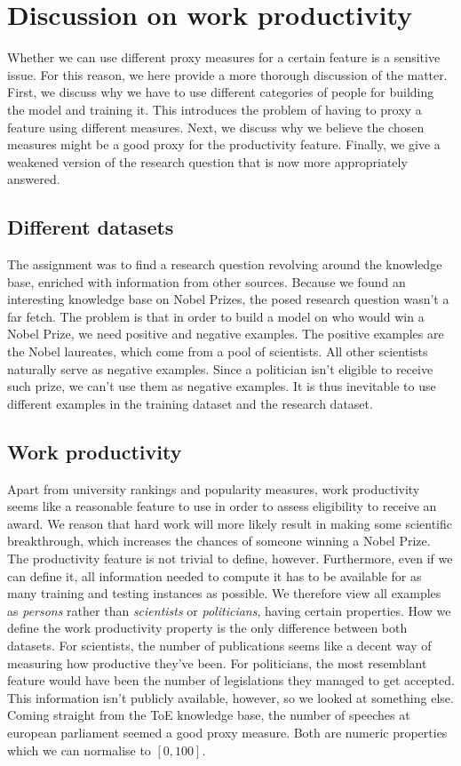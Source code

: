 \section{Discussion on work productivity}
\label{sec:productivity}

Whether we can use different proxy measures for a certain feature is a sensitive issue. For this reason, we here provide a more thorough discussion of the matter. First, we discuss why we have to use different categories of people for building the model and training it. This introduces the problem of having to proxy a feature using  different measures. Next, we discuss why we believe the chosen measures might be a good proxy for the productivity feature. Finally, we give a weakened version of the research question that is now more appropriately answered.

\subsection{Different datasets}

The assignment was to find a research question revolving around the knowledge base, enriched with information from other sources. Because we found an interesting knowledge base on Nobel Prizes, the posed research question wasn't a far fetch. The problem is that in order to build a model on who would win a Nobel Prize, we need positive and negative examples. The positive examples are the Nobel laureates, which come from a pool of scientists. All other scientists naturally serve as negative examples. Since a politician isn't eligible to receive such prize, we can't use them as negative examples. It is thus inevitable to use different examples in the training dataset and the research dataset.

\subsection{Work productivity}

Apart from university rankings and popularity measures, work productivity seems like a reasonable feature to use in order to assess eligibility to receive an award. We reason that hard work will more likely result in making some scientific breakthrough, which increases the chances of someone winning a Nobel Prize. The productivity feature is not trivial to define, however. Furthermore, even if we can define it, all information needed to compute it has to be available for as many training and testing instances as possible. We therefore view all examples as \emph{persons} rather than \emph{scientists} or \emph{politicians}, having certain properties. How we define the work productivity property is the only difference between both datasets. For scientists, the number of publications seems like a decent way of measuring how productive they've been. For politicians, the most resemblant feature would have been the number of legislations they managed to get accepted. This information isn't publicly available, however, so we looked at something else. Coming straight from the ToE knowledge base, the number of speeches at european parliament seemed a good proxy measure. Both are numeric properties which we can normalise to $[0, 100]$.


